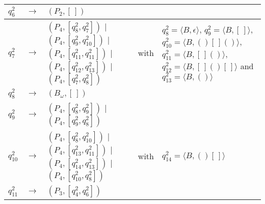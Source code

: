 \begin{table}[ht]
\begin{tabular}[t]{|lcp{5.7cm}|lcp{5cm}|}
	\hline
	
	$q_{6}^{2}$ & $\longrightarrow$ & $(P_{2}, [\,])$ & & &\\
	
	\hline
	
	$q_{7}^{2}$ & $\longrightarrow$ & $(P_{4}, [q_{8}^{2}, q_{7}^{2}])$ | $(P_{4}, [q_{9}^{2}, q_{10}^{2}])$ | $(P_{4}, [q_{11}^{2}, q_{11}^{2}])$ | $(P_{4}, [q_{12}^{2}, q_{13}^{2}])$ | $(P_{4}, [q_{7}^{2}, q_{8}^{2}])$ & & with & $q_{8}^{2}=\langle B,\epsilon \rangle$, $q_{9}^{2}=\langle B,[\,] \rangle$, $q_{10}^{2}=\langle B,()[\,]() \rangle$, $q_{11}^{2}=\langle B,[\,]() \rangle$, $q_{12}^{2}=\langle B,[\,]()[\,] \rangle$ and $q_{13}^{2}=\langle B,() \rangle$\\
	
	\hline
	
	$q_{8}^{2}$ & $\longrightarrow$ & $(B_\omega,[\,])$ & & &\\
	
	\hline
	
	$q_{9}^{2}$ & $\longrightarrow$ & $(P_{4}, [q_{8}^{2}, q_{9}^{2}])$ | $(P_{4}, [q_{9}^{2}, q_{8}^{2}])$ & & &\\
	
	\hline
	
	$q_{10}^{2}$ & $\longrightarrow$ & $(P_{4}, [q_{8}^{2}, q_{10}^{2}])$ | $(P_{4}, [q_{13}^{2}, q_{11}^{2}])$ | $(P_{4}, [q_{14}^{2}, q_{13}^{2}])$ | $(P_{4}, [q_{10}^{2}, q_{8}^{2}])$ & & with & $q_{14}^{2}=\langle B,()[\,]    \rangle$\\
	
	\hline
	
	$q_{11}^{2}$ & $\longrightarrow$ & $(P_{3}, [q_{4}^{2}, q_{6}^{2}])$ & & &\\
	

\end{tabular}
\end{table}

